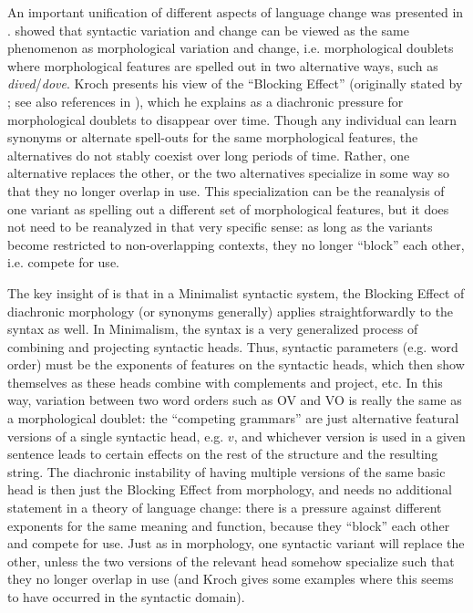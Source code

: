An important unification of different aspects of language change was presented in \citet{kroch1994}.
\citet{kroch1994} showed that syntactic variation and change can be viewed as the same phenomenon as morphological variation and change, i.e. morphological doublets where morphological features are spelled out in two alternative ways, such as \textsl{dived}/\textsl{dove}.
Kroch presents his view of the ``Blocking Effect'' (originally stated by \citealt{aronoff1976}; see also references in \citealt{kroch1994}), which he explains as a diachronic pressure for morphological doublets to disappear over time.
Though any individual can learn synonyms or alternate spell-outs for the same morphological features, the alternatives do not stably coexist over long periods of time.
Rather, one alternative replaces the other, or the two alternatives specialize in some way so that they no longer overlap in use.
This specialization can be the reanalysis of one variant as spelling out a different set of morphological features, but it does not need to be reanalyzed in that very specific sense: as long as the variants become restricted to non-overlapping contexts, they no longer ``block'' each other, i.e. compete for use.

The key insight of \citet{kroch1994} is that in a Minimalist syntactic system, the Blocking Effect of diachronic morphology (or synonyms generally) applies straightforwardly to the syntax as well.
In Minimalism, the syntax is a very generalized process of combining and projecting syntactic heads.
Thus, syntactic parameters (e.g. word order) must be the exponents of features on the syntactic heads, which then show themselves as these heads combine with complements and project, etc.
In this way, variation between two word orders such as OV and VO is really the same as a morphological doublet: the ``competing grammars'' \citep{kroch1989} are just alternative featural versions of a single syntactic head, e.g. $v$, and whichever version is used in a given sentence leads to certain effects on the rest of the structure and the resulting string.
The diachronic instability of having multiple versions of the same basic head is then just the Blocking Effect from morphology, and needs no additional statement in a theory of language change: there is a pressure against different exponents for the same meaning and function, because they ``block'' each other and compete for use.
Just as in morphology, one syntactic variant will replace the other, unless the two versions of the relevant head somehow specialize such that they no longer overlap in use (and Kroch gives some examples where this seems to have occurred in the syntactic domain).

